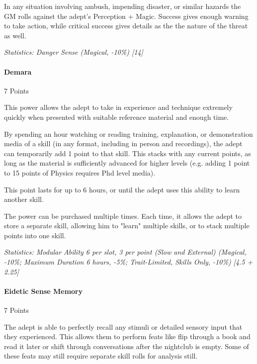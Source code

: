 \begin{multicols*}{3}
	In any situation involving ambush, impending disaster, or similar hazards the GM rolls against the adept's Perception + Magic. Success gives enough warning to take action, while critical success gives details as the the nature of the threat as well.

	\textcolor{OliveGreen}{\textit{Statistics: Danger Sense (Magical, -10\%) [14] }}
	
	
	\paragraph{Demara}
	\begin{flushright}
		7 Points
	\end{flushright}

	This power allows the adept to take in experience and technique extremely quickly when presented with suitable reference material and enough time.
	
	By spending an hour watching or reading training, explanation, or demonstration media of a skill (in any format, including in person and recordings), the adept can temporarily add 1 point to that skill. This stacks with any current points, as long as the material is sufficiently advanced for higher levels (e.g. adding 1 point to 15 points of Physics requires Phd level media).
	
	This point lasts for up to 6 hours, or until the adept uses this ability to learn another skill.
	
	The power can be purchased multiple times. Each time, it allows the adept to store a separate skill, allowing him to "learn" multiple skills, or to stack multiple points into one skill.

	\textcolor{OliveGreen}{\textit{Statistics: Modular Ability 6 per slot, 3 per point (Slow and External) (Magical, -10\%; Maximum Duration 6 hours, -5\%; Trait-Limited, Skills Only, -10\%) [4.5 + 2.25] }}
	
	
	\paragraph{Eidetic Sense Memory}
	\begin{flushright}
		7 Points
	\end{flushright}

	The adept is able to perfectly recall any stimuli or detailed sensory input that they experienced. This allows them to perform feats like flip through a book and read it later or shift through conversations after the nightclub is empty. Some of these feats may still require separate skill rolls for analysis still.
	

\end{multicols*}
